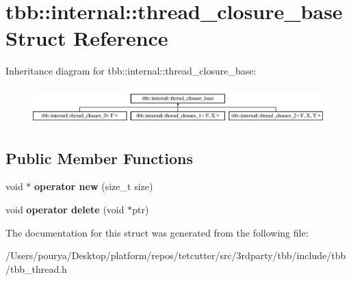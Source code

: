 \hypertarget{structtbb_1_1internal_1_1thread__closure__base}{}\section{tbb\+:\+:internal\+:\+:thread\+\_\+closure\+\_\+base Struct Reference}
\label{structtbb_1_1internal_1_1thread__closure__base}
Inheritance diagram for tbb\+:\+:internal\+:\+:thread\+\_\+closure\+\_\+base\+:\begin{figure}[H]
\begin{center}
\leavevmode
\includegraphics[height=1.447028cm]{structtbb_1_1internal_1_1thread__closure__base}
\end{center}
\end{figure}
\subsection*{Public Member Functions}
\begin{DoxyCompactItemize}
\item 
\hypertarget{structtbb_1_1internal_1_1thread__closure__base_a624f5a5a40051faf39444ad3a9f36df5}{}void $\ast$ {\bfseries operator new} (size\+\_\+t size)\label{structtbb_1_1internal_1_1thread__closure__base_a624f5a5a40051faf39444ad3a9f36df5}

\item 
\hypertarget{structtbb_1_1internal_1_1thread__closure__base_a56e1bfd2ca46abcc3c3f265eff10360d}{}void {\bfseries operator delete} (void $\ast$ptr)\label{structtbb_1_1internal_1_1thread__closure__base_a56e1bfd2ca46abcc3c3f265eff10360d}

\end{DoxyCompactItemize}


The documentation for this struct was generated from the following file\+:\begin{DoxyCompactItemize}
\item 
/\+Users/pourya/\+Desktop/platform/repos/tetcutter/src/3rdparty/tbb/include/tbb/tbb\+\_\+thread.\+h\end{DoxyCompactItemize}
